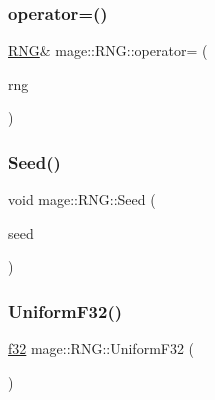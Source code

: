 \hypertarget{classmage_1_1_r_n_g_ac9155db13a3d4b7f44a4f800085197a2}{}\label{classmage_1_1_r_n_g_ac9155db13a3d4b7f44a4f800085197a2} 
\subsubsection{\texorpdfstring{operator=()}{operator=()}\hspace{0.1cm}{\footnotesize\ttfamily [2/2]}}
{\footnotesize\ttfamily \hyperlink{classmage_1_1_r_n_g}{R\+NG}\& mage\+::\+R\+N\+G\+::operator= (\begin{DoxyParamCaption}\item[{\hyperlink{classmage_1_1_r_n_g}{R\+NG} \&\&}]{rng }\end{DoxyParamCaption})\hspace{0.3cm}{\ttfamily [delete]}}

\hypertarget{classmage_1_1_r_n_g_ad717051d623a2118110d3e756c45dde8}{}\label{classmage_1_1_r_n_g_ad717051d623a2118110d3e756c45dde8} 
\subsubsection{\texorpdfstring{Seed()}{Seed()}}
{\footnotesize\ttfamily void mage\+::\+R\+N\+G\+::\+Seed (\begin{DoxyParamCaption}\item[{\hyperlink{namespacemage_af2b398bf98eb10351f49cad73fe2cc73}{u32}}]{seed }\end{DoxyParamCaption})\hspace{0.3cm}{\ttfamily [noexcept]}}

\hypertarget{classmage_1_1_r_n_g_a3499989188da06e9cb013526794451d3}{}\label{classmage_1_1_r_n_g_a3499989188da06e9cb013526794451d3} 
\subsubsection{\texorpdfstring{Uniform\+F32()}{UniformF32()}}
{\footnotesize\ttfamily \hyperlink{namespacemage_a6a44ad388483959dc4dff9f2aef91431}{f32} mage\+::\+R\+N\+G\+::\+Uniform\+F32 (\begin{DoxyParamCaption}{ }\end{DoxyParamCaption})\hspace{0.3cm}{\ttfamily [noexcept]}}


